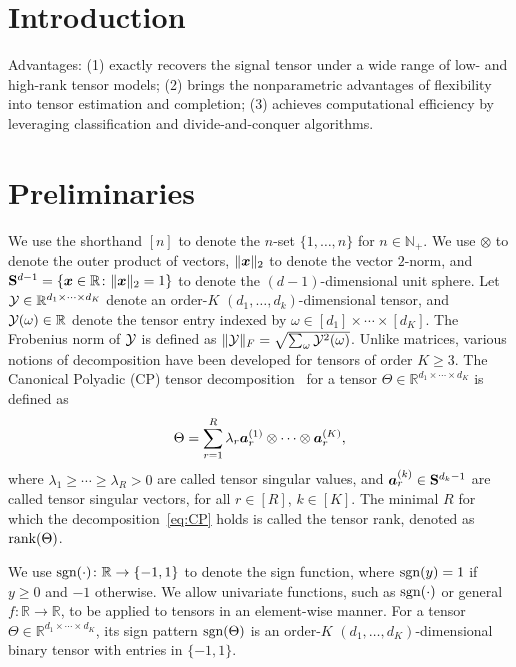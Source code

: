 \documentclass{article}
\theoremstyle{plain}
\theoremstyle{definition}
\def\sign{\textup{sgn}}
\def\rank{\textup{rank}}
\begin{document}
\section{Introduction}\label{Intro}

Advantages:
(1) exactly recovers the signal tensor under a wide range of low- and high-rank tensor models; 
(2) brings the nonparametric advantages of flexibility into tensor estimation and completion; 
(3) achieves computational efficiency by leveraging classification and divide-and-conquer algorithms.

\section{Preliminaries}
We use the shorthand $[n]$ to denote the $n$-set $\{1,\ldots,n\}$ for $n\in\mathbb{N}_{+}$. We use $\otimes$ to denote the outer product of vectors, $\lVert\bm x\rVert_2$ to denote the vector $2$-norm, and $\mathbf{S}^{d-1}=\{\bm x\in\mathbb{R}\colon \lVert\bm x\rVert_2=1\}$ to denote the $(d-1)$-dimensional unit sphere. Let $\mathcal{Y}\in\mathbb{R}^{d_1\times \cdots \times d_K}$ denote an order-$K$ $(d_1,\ldots,d_k)$-dimensional tensor, and $\mathcal{Y}(\omega)\in\mathbb{R}$ denote the tensor entry indexed by $\omega \in[d_1]\times \cdots \times [d_K]$. The Frobenius norm of $\mathcal{Y}$ is defined as $\lVert\mathcal{Y}\rVert_F=\sqrt{\sum_{\omega}\mathcal{Y}^2(\omega)}$. Unlike matrices, various notions of decomposition have been developed for tensors of order $K\geq 3$. The Canonical Polyadic (CP) tensor decomposition~\cite{hitchcock1927expression} for a tensor $\Theta\in\mathbb{R}^{d_1\times \cdots \times d_K}$ is defined as
\begin{equation}\label{eq:CP}
\Theta=\sum_{r=1}^R\lambda_r \bm{a}^{(1)}_r\otimes\cdots\otimes \bm{a}^{(K)}_r,
\end{equation}
where $\lambda_1\geq \cdots \geq \lambda_R>0$ are called tensor singular values, and $\bm{a}^{(k)}_r \in \mathbf{S}^{d_k-1}$ are called tensor singular vectors, for all $r\in[R]$, $k\in[K]$. The minimal $R$ for which the decomposition~\eqref{eq:CP} holds is called the tensor rank, denoted as $\rank(\Theta)$. 

We use $\sign(\cdot)\colon \mathbb{R}\to\{-1,1\}$ to denote the sign function, where $\sign(y)=1$ if $y\geq 0$ and $-1$ otherwise. We allow univariate functions, such as $\sign(\cdot)$ or general $f\colon \mathbb{R}\to\mathbb{R}$, to be applied to tensors in an element-wise manner. For a tensor $\Theta\in\mathbb{R}^{d_1\times \cdots \times d_K}$, its sign pattern $\sign(\Theta)$ is an order-$K$ $(d_1,\ldots,d_K)$-dimensional binary tensor with entries in $\{-1,1\}$. 
\end{document}
